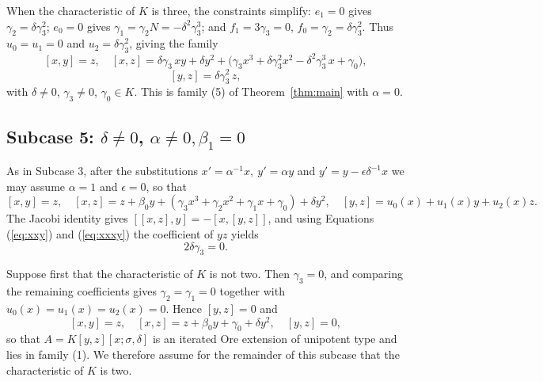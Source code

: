 \documentclass[a4paper,11pt,twoside,notitlepage,reqno]{amsart}
\theoremstyle{plain}
\numberwithin{thm}{section}
\theoremstyle{definition}
\begin{document}
When the characteristic of $K$ is three, the constraints simplify: $e_1=0$ gives
$\gamma_2=\delta\gamma_3^2$; $e_0=0$ gives $\gamma_1=\gamma_2 N=-\delta^2\gamma_3^3$; and
$f_1=3\gamma_3=0$, $f_0=\gamma_2=\delta\gamma_3^2$. Thus $u_0=u_1=0$ and
$u_2=\delta\gamma_3^2$, giving the family
$$[x,y]=z,\quad [x,z]= \delta\gamma_3\, xy + \delta y^2 + \big(\gamma_3 x^3 +\delta \gamma_3^2 x^2-\delta^2\gamma_3^3\, x+\gamma_0\big),$$
$$[y,z]= \delta\gamma_3^2\, z,$$
with $\delta
\neq 0$, $\gamma_3
\neq 0$, $\gamma_0\in K$. This is family (5) of
Theorem~\ref{thm:main} with $\alpha=0$.







\subsection{Subcase 5: $\delta\neq 0$, $\alpha\neq 0, \beta_1=0$}


As in Subcase 3, after the substitutions $x'=\alpha^{-1}x,\ y'=\alpha y$ and
$y'=y-\epsilon\delta^{-1}x$ we may assume $\alpha=1$ and $\epsilon=0$, so that
$$[x,y]=z,\quad [x,z]= z + \beta_0 y + (\gamma_3 x^3+ \gamma_2 x^2 + \gamma_1 x + \gamma_0 ) +\delta y^2,\quad [y,z]= u_0(x) + u_1(x) y + u_2(x) z.$$
The Jacobi identity gives $[[x,z],y]=-[x,[y,z]]$, and using Equations
(\ref{eq:xxy}) and (\ref{eq:xxxy}) the coefficient of $yz$ yields
$$2\delta\gamma_3=0.$$

Suppose first that the characteristic of $K$ is not two.
Then $\gamma_3=0$, and comparing the
remaining coefficients gives $\gamma_2=\gamma_1=0$ together with
$u_0(x)=u_1(x)=u_2(x)=0$. Hence $[y,z]=0$ and
$$[x,y]=z,\quad [x,z]=z+\beta_0 y+\gamma_0+\delta y^2,\quad [y,z]=0,$$
so that $A=K[y,z][x;\sigma,\delta]$ is an iterated Ore extension of unipotent
type and lies in family (1). We therefore assume for the
remainder of this subcase that the characteristic of $K$ is two.
\end{document}

